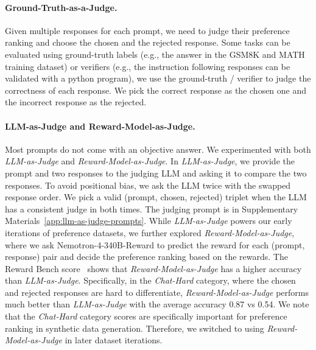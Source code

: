 \documentclass[11pt]{article}
\newcommand{\oursrm}{Nemotron-4-340B-Reward}
\newcommand{\jqz}[1]{{\color{green}{[Jiaqi: #1]}}}
\begin{document}

\paragraph{Ground-Truth-as-a-Judge.} Given multiple responses for each prompt, we need to judge their preference ranking and choose the chosen and the rejected response. Some tasks can be evaluated using ground-truth labels (e.g., the answer in the GSM8K and MATH training dataset) or verifiers (e.g., the instruction following responses can be validated with a python program), we use the ground-truth / verifier to judge the correctness of each response. We pick the correct response as the chosen one and the incorrect response as the rejected. 

\paragraph{{LLM-as-Judge} and {Reward-Model-as-Judge}.} Most prompts do not come with an objective answer. We experimented with both \textit{LLM-as-Judge} and \textit{Reward-Model-as-Judge}. In \textit{LLM-as-Judge}, we provide the prompt and two responses to the judging LLM and asking it to compare the two responses. To avoid positional bias, we ask the LLM twice with the swapped response order. We pick a valid (prompt, chosen, rejected) triplet when the LLM has a consistent judge in both times. The judging prompt is in Supplementary Materials~\ref{app:llm-as-judge-prompts}. While \textit{LLM-as-Judge} powers our early iterations of preference datasets, we further explored \textit{Reward-Model-as-Judge}, where we ask \oursrm{} to predict the reward for each (prompt, response) pair and decide the preference ranking based on the rewards. The Reward Bench score~\citep{lambert2024rewardbench} shows that \textit{Reward-Model-as-Judge} has a higher accuracy than \textit{LLM-as-Judge}. 
Specifically, in the \textit{Chat-Hard} category, where the chosen and rejected responses are hard to differentiate, \textit{Reward-Model-as-Judge} performs much better than \textit{LLM-as-Judge} with the average accuracy 0.87 vs 0.54. We note that the \textit{Chat-Hard} category scores are specifically important for preference ranking in synthetic data generation. Therefore, we switched to using \textit{Reward-Model-as-Judge} in later dataset iterations.
\end{document}

